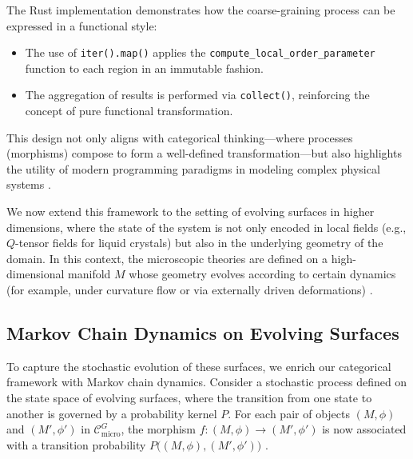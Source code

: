 \begin{remark}
	The Rust implementation demonstrates how the coarse-graining process can be expressed in a functional style:
	\begin{itemize}
		\item The use of \texttt{iter().map()} applies the \texttt{compute\_local\_order\_parameter} function to each region in an immutable fashion.
		\item The aggregation of results is performed via \texttt{collect()}, reinforcing the concept of pure functional transformation.
	\end{itemize}
	This design not only aligns with categorical thinking---where processes (morphisms) compose to form a well-defined transformation---but also highlights the utility of modern programming paradigms in modeling complex physical systems \cite{hudak1989conception}.
\end{remark}

We now extend this framework to the setting of evolving surfaces in higher dimensions, where the state of the system is not only encoded in local fields (e.g., \(Q\)-tensor fields for liquid crystals) but also in the underlying geometry of the domain. In this context, the microscopic theories are defined on a high-dimensional manifold \(M\) whose geometry evolves according to certain dynamics (for example, under curvature flow or via externally driven deformations) \cite{hamilton1982three, grayson1987shortening}.

\subsection{Markov Chain Dynamics on Evolving Surfaces}

To capture the stochastic evolution of these surfaces, we enrich our categorical framework with Markov chain dynamics. Consider a stochastic process defined on the state space of evolving surfaces, where the transition from one state to another is governed by a probability kernel \(P\). For each pair of objects \((M, \phi)\) and \((M', \phi')\) in \(\mathcal{C}_{\text{micro}}^G\), the morphism \(f: (M, \phi) \to (M', \phi')\) is now associated with a transition probability \(P\big((M, \phi), (M', \phi')\big)\) \cite{levin2009markov}.

